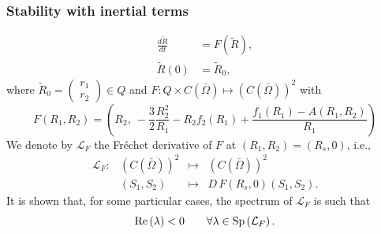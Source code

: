 \documentclass[10pt,aspectratio=169]{beamer}
\newcommand{\cont}{C\left(\bar{\Omega}\right)}
\newcommand{\Sp}[1]{\textnormal{Sp}\left(#1\right)}
\begin{document}
\begin{frame}
\frametitle{Stability with inertial terms}
\vspace*{0.5cm}
\begin{equation}
\begin{split}
\frac{d\tilde{R}}{dt}&=F(\tilde{R}),\\
\tilde{R}(0)&=\tilde{R}_0,
\end{split}
\end{equation}
where $\tilde{R}_0=\begin{pmatrix}
{r}_1\\ {r}_2
\end{pmatrix}\in Q$ and $F:Q\times \cont\mapsto \left(\cont\right)^2$ with
\begin{equation}
F(R_1,R_2)=\left(
R_2,~-\frac{3}{2}\frac{R_2^2}{R_1}-R_2f_2\left(R_1\right)+\frac{f_1\left(R_1\right)-A\left(R_1,R_2\right)}{R_1}\right)
\end{equation}
We denote by $\mathcal{L}_F$ the Fréchet derivative of $F$ at $\left(R_1,R_2\right)=\left(R_s,0\right)$, i.e.,
\begin{equation}
\begin{array}{cccl}
\mathcal{L}_F:&\left(\cont\right)^2&\longmapsto& \left(\cont\right)^2\\
&(S_1,S_2)& \longmapsto & D\,F\left(R_s,0\right)\left(S_1,S_2\right).\label{eq:jacobian_inertia}
\end{array}
\end{equation} 
It is shown that, for some particular cases, the spectrum of $\mathcal{L}_F$ is such that $$\mbox{Re}\left(\lambda\right)<0\qquad \forall \lambda\in \Sp{\mathcal{L}_F}.$$
\end{frame}

\end{document}
